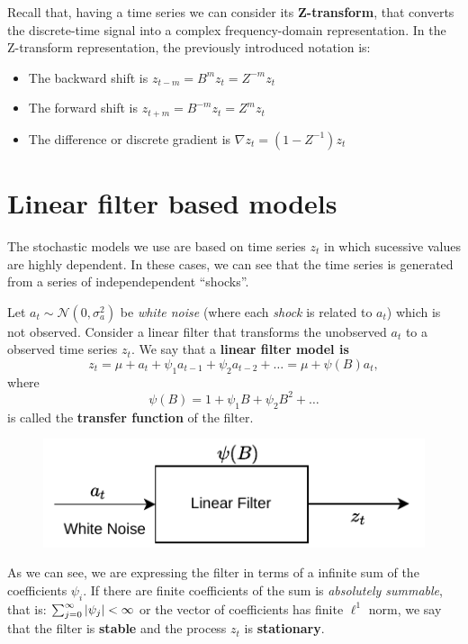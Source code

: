 Recall that, having a time series we can consider its \textbf{Z-transform}, that converts the discrete-time signal into a complex frequency-domain representation. In the Z-transform representation, the previously introduced notation is:
\begin{itemize}
  \item The backward shift is \(z_{t-m} = B^{m}z_{t} = Z^{-m}z_{t}\)
  \item The forward shift is \(z_{t+m} = B^{-m}z_{t} = Z^{m}z_{t}\)
        \item The difference or discrete gradient is \(\nabla z_{t} = (1-Z^{-1})z_{t}\)
\end{itemize}


\section{Linear filter based models}

The stochastic models we use are based on time series \(z_{t}\) in which sucessive values are highly dependent. In these cases, we can see that the time series is generated from a series of independependent ``shocks''.

\begin{ndef}
  Let \(a_{t} \sim \mathcal N\left(0,\sigma_{a}^{2}\right)\) be \emph{white noise} (where each \emph{shock} is related to \(a_{t}\)) which is not observed. Consider a linear filter that transforms the unobserved \(a_{t}\) to a observed time series \(z_{t}\). We say that a \textbf{linear filter model is}
  \[
    z_{t} = \mu + a_{t} + \psi_{1}a_{t-1} + \psi_{2}a_{t-2} + \dots = \mu + \psi(B)a_{t},
  \]
  where
  \[
    \psi(B) = 1 + \psi_{1}B + \psi_{2}B^{2} + \dots
  \]
  is called the \textbf{transfer function} of the filter.
\end{ndef}

\begin{figure}[H]

  \centering
  \includegraphics{Figures/LinearFilter}

\end{figure}

As we can see, we are expressing the filter in terms of a infinite sum of the coefficients \(\psi_{i}\). If there are finite coefficients of the sum is \emph{absolutely summable}, that is: \(\sum_{j = 0}^{\infty}\left\lvert \psi_{j} \right\rvert < \infty\) or the vector of coefficients has finite \(\ell^{1}\) norm, we say that the filter is \textbf{stable} and the process \(z_{t}\) is \textbf{stationary}.

